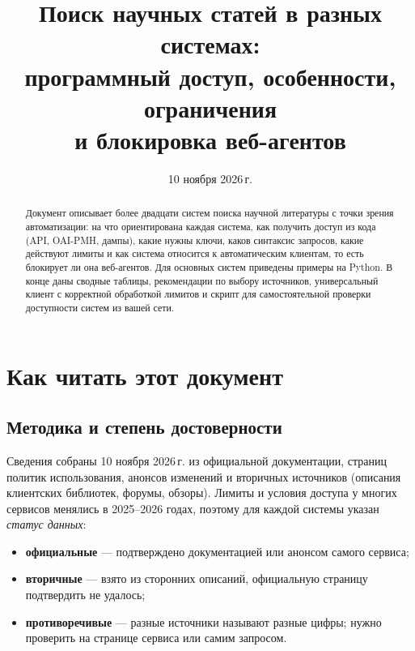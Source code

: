 \documentclass[11pt,a4paper]{article}
\title{\sffamily\bfseries\color{accent}
Поиск научных статей в разных системах:\\[2pt]
программный доступ, особенности, ограничения\\и блокировка веб-агентов}
\author{}
\date{10 ноября 2026\,г.}
\begin{document}
\maketitle
\thispagestyle{fancy}

\begin{abstract}
\noindent Документ описывает более двадцати систем поиска научной литературы с точки зрения автоматизации: на что ориентирована каждая система, как получить доступ из кода (API, OAI-PMH, дампы), какие нужны ключи, каков синтаксис запросов, какие действуют лимиты и как система относится к автоматическим клиентам, то есть блокирует ли она веб-агентов. Для основных систем приведены примеры на Python. В конце даны сводные таблицы, рекомендации по выбору источников, универсальный клиент с корректной обработкой лимитов и скрипт для самостоятельной проверки доступности систем из вашей сети.
\end{abstract}

\tableofcontents
\newpage

\section{Как читать этот документ}

\subsection{Методика и степень достоверности}

Сведения собраны 10 ноября 2026\,г. из официальной документации, страниц политик использования, анонсов изменений и вторичных источников (описания клиентских библиотек, форумы, обзоры). Лимиты и условия доступа у многих сервисов менялись в 2025--2026 годах, поэтому для каждой системы указан \emph{статус данных}:

\begin{itemize}
  \item \textbf{официальные} --- подтверждено документацией или анонсом самого сервиса;
  \item \textbf{вторичные} --- взято из сторонних описаний, официальную страницу подтвердить не удалось;
  \item \textbf{противоречивые} --- разные источники называют разные цифры; нужно проверить на странице сервиса или самим запросом.
\end{itemize}
\end{document}
